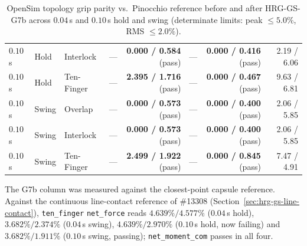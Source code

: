 \documentclass[11pt,a4paper]{article}
\begin{document}
\begin{table}[htbp]
\begin{tabular}{lllrrrrr}
$0.10$\,s & Hold & Interlock & --- & \textbf{0.000 / 0.584} (pass) & --- & \textbf{0.000 / 0.416} (pass) & 2.19 / 6.06 \\
$0.10$\,s & Hold & Ten-Finger & --- & \textbf{2.395 / 1.716} (pass) & --- & \textbf{0.000 / 0.467} (pass) & 9.63 / 6.81 \\
$0.10$\,s & Swing & Overlap & --- & \textbf{0.000 / 0.573} (pass) & --- & \textbf{0.000 / 0.400} (pass) & 2.06 / 5.85 \\
$0.10$\,s & Swing & Interlock & --- & \textbf{0.000 / 0.573} (pass) & --- & \textbf{0.000 / 0.400} (pass) & 2.06 / 5.85 \\
$0.10$\,s & Swing & Ten-Finger & --- & \textbf{2.499 / 1.922} (pass) & --- & \textbf{0.000 / 0.845} (pass) & 7.47 / 4.91 \\
\bottomrule
\end{tabular}
\caption{OpenSim topology grip parity vs.\ Pinocchio reference before and after HRG-GS-G7b across $0.04$\,s and $0.10$\,s hold and swing (determinate limits: peak $\le 5.0\%$, RMS $\le 2.0\%$).}
\label{tab:g7b_before_after_parity}
\end{table}
The G7b column was measured against the closest-point capsule reference. Against the continuous line-contact reference of
\#13308 (Section~\ref{sec:hrg-gs-line-contact}), \texttt{ten\_finger} \texttt{net\_force} reads $4.639\% / 4.577\%$
($0.04$\,s hold), $3.682\% / 2.374\%$ ($0.04$\,s swing), $4.639\% / 2.970\%$ ($0.10$\,s hold, now failing) and
$3.682\% / 1.911\%$ ($0.10$\,s swing, passing); \texttt{net\_moment\_com} passes in all four.
\end{document}
